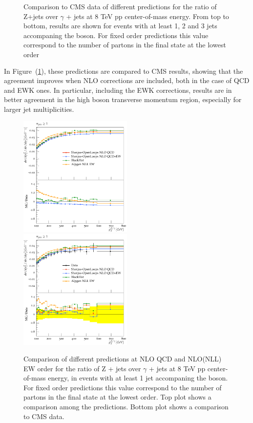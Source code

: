 \documentclass[11pt]{cernrep} \usepackage{graphicx,epsfig} 
\begin{document}
\begin{figure}
\begin{center}
 \caption{Comparison to CMS data of different predictions for the ratio of Z+jets over $\gamma$ + jets at 8 TeV pp
   center-of-mass energy. From top to bottom, results are shown for events with at least 1, 2 and 3 jets accompaning the
   boson. For fixed order predictions this value
correspond to the number of partons in the final state at the lowest
order}
\label{zgrdata}
\end{center}
\end{figure}

In Figure~(\ref{zgrdata}), these predictions are compared to CMS results, showing that the agreement improves
when NLO corrections are included, both in the case of QCD and EWK ones. In particular, including the EWK corrections,
results are in better agreement in the high boson transverse momentum region, especially for larger jet multiplicities. 

\begin{figure}
\begin{center}
\includegraphics[width=0.5\textwidth]{d07-x01-y01-SherpaOL-mc.pdf} \\
\includegraphics[width=0.5\textwidth]{d07-x01-y01-SherpaOL.pdf} \\
 \caption{Comparison of different predictions at NLO QCD and NLO(NLL) EW order for the 
   ratio of Z + jets over $\gamma$ + jets at 8 TeV pp
   center-of-mass energy, in events with at least 1 jet accompaning the
   boson. For fixed order predictions this value correspond to the
   number of partons in the final state at the lowest order. Top plot
   shows a comparison among the predictions. Bottom plot shows a comparison to CMS data. } 
\label{zgrNLO}
\end{center}
\end{figure}
\end{document}
